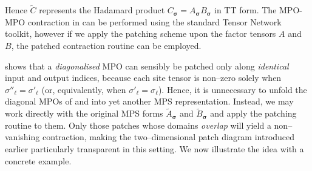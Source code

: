 Hence $\widetilde{C}$ represents the Hadamard product
$C_{\boldsymbol{\sigma}}=A_{\boldsymbol{\sigma}}B_{\boldsymbol{\sigma}}$ in TT form. The MPO-MPO contraction in  can be performed using the standard Tensor Network toolkit, however if we apply the patching scheme upon the factor tensors $A$ and $B$, the patched contraction routine can be employed.

 shows that a \emph{diagonalised} MPO can sensibly be patched only along \emph{identical} input and output indices, because each site tensor is non–zero solely when \(\sigma''_{\ell}=\sigma'_{\ell}\) (or, equivalently, when \(\sigma'_{\ell}=\sigma_{\ell}\)).
Hence, it is unnecessary to unfold the diagonal MPOs of  and  into yet another MPS representation.  
Instead, we may work directly with the original MPS forms
\(\widetilde{A}_{\boldsymbol{\sigma}}\) and
\(\widetilde{B}_{\boldsymbol{\sigma}}\) and apply the patching routine to them.  Only those patches whose domains \emph{overlap} will yield a non–vanishing contraction, making the two–dimensional patch diagram
introduced earlier particularly transparent in this setting. We now illustrate the idea with a concrete example.

